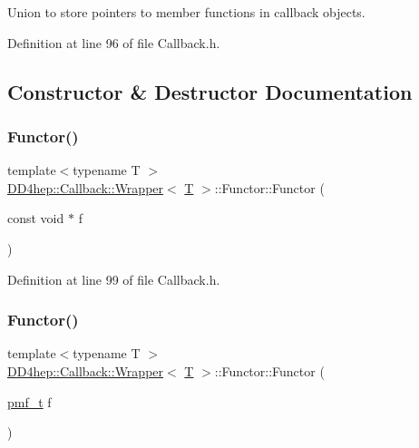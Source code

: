 Union to store pointers to member functions in callback objects. 

Definition at line 96 of file Callback.\+h.



\subsection{Constructor \& Destructor Documentation}
\hypertarget{union_d_d4hep_1_1_callback_1_1_wrapper_1_1_functor_aa5d398e7679a40c08f44253099d14476}{}\label{union_d_d4hep_1_1_callback_1_1_wrapper_1_1_functor_aa5d398e7679a40c08f44253099d14476} 
\subsubsection{\texorpdfstring{Functor()}{Functor()}\hspace{0.1cm}{\footnotesize\ttfamily [1/2]}}
{\footnotesize\ttfamily template$<$typename T $>$ \\
\hyperlink{class_d_d4hep_1_1_callback_1_1_wrapper}{D\+D4hep\+::\+Callback\+::\+Wrapper}$<$ \hyperlink{class_t}{T} $>$\+::Functor\+::\+Functor (\begin{DoxyParamCaption}\item[{const void $\ast$}]{f }\end{DoxyParamCaption})\hspace{0.3cm}{\ttfamily [inline]}}



Definition at line 99 of file Callback.\+h.

\hypertarget{union_d_d4hep_1_1_callback_1_1_wrapper_1_1_functor_a866665797965a87012088cfc1444a0ca}{}\label{union_d_d4hep_1_1_callback_1_1_wrapper_1_1_functor_a866665797965a87012088cfc1444a0ca} 
\subsubsection{\texorpdfstring{Functor()}{Functor()}\hspace{0.1cm}{\footnotesize\ttfamily [2/2]}}
{\footnotesize\ttfamily template$<$typename T $>$ \\
\hyperlink{class_d_d4hep_1_1_callback_1_1_wrapper}{D\+D4hep\+::\+Callback\+::\+Wrapper}$<$ \hyperlink{class_t}{T} $>$\+::Functor\+::\+Functor (\begin{DoxyParamCaption}\item[{\hyperlink{class_d_d4hep_1_1_callback_1_1_wrapper_ab266379df9f395d1221b2adbf62b112c}{pmf\+\_\+t}}]{f }\end{DoxyParamCaption})\hspace{0.3cm}{\ttfamily [inline]}}



